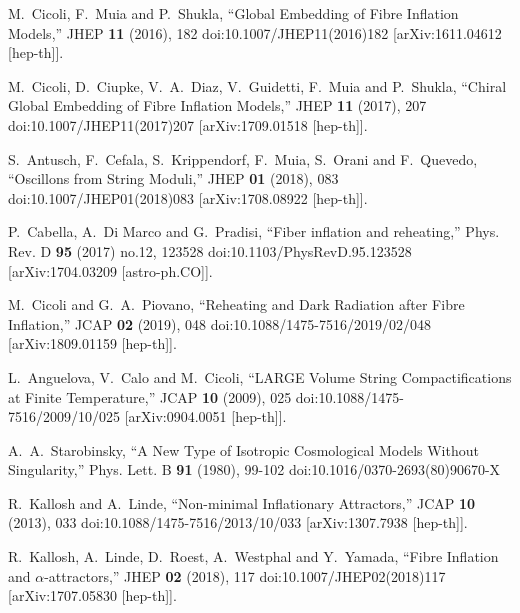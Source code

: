 \documentclass[aps,prd,a4paper,twocolumn,amsmath,showpacs,superscriptaddress,nofootinbib,preprintnumbers]{revtex4-1}
\begin{document}
\begin{thebibliography}{99}
M.~Cicoli, F.~Muia and P.~Shukla,
``Global Embedding of Fibre Inflation Models,''
JHEP \textbf{11} (2016), 182
doi:10.1007/JHEP11(2016)182
[arXiv:1611.04612 [hep-th]].

M.~Cicoli, D.~Ciupke, V.~A.~Diaz, V.~Guidetti, F.~Muia and P.~Shukla,
``Chiral Global Embedding of Fibre Inflation Models,''
JHEP \textbf{11} (2017), 207
doi:10.1007/JHEP11(2017)207
[arXiv:1709.01518 [hep-th]].

S.~Antusch, F.~Cefala, S.~Krippendorf, F.~Muia, S.~Orani and F.~Quevedo,
``Oscillons from String Moduli,''
JHEP \textbf{01} (2018), 083
doi:10.1007/JHEP01(2018)083
[arXiv:1708.08922 [hep-th]].

P.~Cabella, A.~Di Marco and G.~Pradisi,
``Fiber inflation and reheating,''
Phys. Rev. D \textbf{95} (2017) no.12, 123528
doi:10.1103/PhysRevD.95.123528
[arXiv:1704.03209 [astro-ph.CO]].

M.~Cicoli and G.~A.~Piovano,
``Reheating and Dark Radiation after Fibre Inflation,''
JCAP \textbf{02} (2019), 048
doi:10.1088/1475-7516/2019/02/048
[arXiv:1809.01159 [hep-th]].

L.~Anguelova, V.~Calo and M.~Cicoli,
``LARGE Volume String Compactifications at Finite Temperature,''
JCAP \textbf{10} (2009), 025
doi:10.1088/1475-7516/2009/10/025
[arXiv:0904.0051 [hep-th]].

A.~A.~Starobinsky,
``A New Type of Isotropic Cosmological Models Without Singularity,''
Phys. Lett. B \textbf{91} (1980), 99-102
doi:10.1016/0370-2693(80)90670-X

R.~Kallosh and A.~Linde,
``Non-minimal Inflationary Attractors,''
JCAP \textbf{10} (2013), 033
doi:10.1088/1475-7516/2013/10/033
[arXiv:1307.7938 [hep-th]].

R.~Kallosh, A.~Linde, D.~Roest, A.~Westphal and Y.~Yamada,
``Fibre Inflation and $\alpha$-attractors,''
JHEP \textbf{02} (2018), 117
doi:10.1007/JHEP02(2018)117
[arXiv:1707.05830 [hep-th]].


\end{thebibliography}
\end{document}
